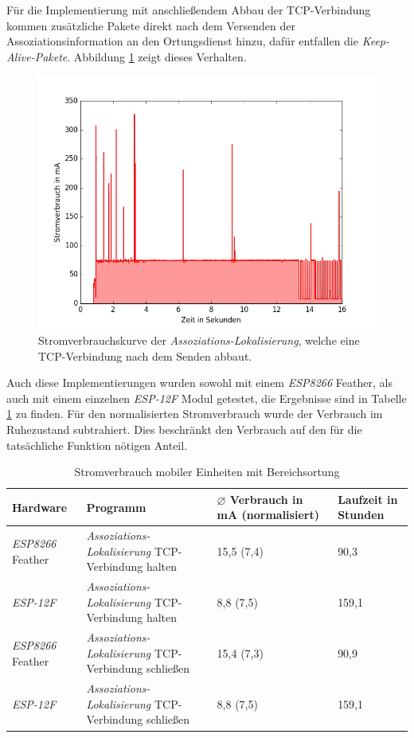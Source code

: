 Für die Implementierung mit anschließendem Abbau der TCP-Verbindung kommen zusätzliche Pakete direkt nach dem Versenden der Assoziationsinformation an den Ortungsdienst hinzu, dafür entfallen die \emph{Keep-Alive-Pakete}.
Abbildung \ref{fig:tcpdisco} zeigt dieses Verhalten.\\

\begin{figure}[h!]
  \centering
	\includegraphics[width=\textwidth]{plots/tcpdisco.png}
  \caption{Stromverbrauchskurve der \emph{Assoziations-Lokalisierung}, welche eine TCP-Verbindung nach dem Senden abbaut.}
  \label{fig:tcpdisco}
\end{figure}

Auch diese Implementierungen wurden sowohl mit einem \emph{ESP8266} Feather, als auch mit einem einzelnen \emph{ESP-12F} Modul getestet, die Ergebnisse sind in Tabelle \ref{table:associatonina} zu finden.
Für den normalisierten Stromverbrauch wurde der Verbrauch im Ruhezustand subtrahiert. 
Dies beschränkt den Verbrauch auf den für die tatsächliche Funktion nötigen Anteil.

\begin{table}[h!]
	\centering
	\caption{Stromverbrauch mobiler Einheiten mit Bereichsortung}
	\label{table:associatonina}
	\begin{tabular}{l|p{5cm}|p{2.5cm}|p{2.5cm}}
		Hardware & Programm & $\varnothing$ Verbrauch in mA (normalisiert) & Laufzeit in Stunden\\
		\hline
		\emph{ESP8266} Feather & \emph{Assoziations-Lokalisierung} TCP-Verbindung halten & 15,5 (7,4) & 90,3\\
		\emph{ESP-12F} & \emph{Assoziations-Lokalisierung} TCP-Verbindung halten & 8,8 (7,5) & 159,1\\
		\emph{ESP8266} Feather & \emph{Assoziations-Lokalisierung} TCP-Verbindung schließen & 15,4 (7,3) & 90,9\\
		\emph{ESP-12F} & \emph{Assoziations-Lokalisierung} TCP-Verbindung schließen & 8,8 (7,5) & 159,1\\
	\end{tabular}
\end{table}


